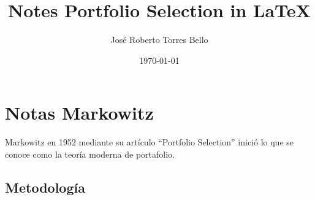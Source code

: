 \documentclass[12pt]{book} %
\title{Notes Portfolio Selection in \LaTeX{}}
\author{José Roberto Torres Bello}
\date{\today}
\begin{document}


\maketitle %

\tableofcontents  %

\newpage

\chapter{Notas Markowitz}

Markowitz en 1952 mediante su artículo ``Portfolio Selection'' inició lo que se conoce como la teoría moderna de portafolio.

\section{Metodología}
\end{document}
